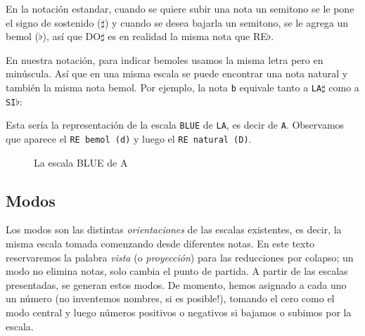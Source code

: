 \documentclass[]{report}
\begin{document}
En la notación estandar, cuando se quiere subir una nota un semitono se le pone el signo de sostenido ($\sharp$) y cuando se desea bajarla un semitono, se le agrega un bemol ($\flat$), así que DO$\sharp$ es en realidad la misma nota que RE$\flat$.

En nuestra notación, para indicar bemoles usamos la misma letra pero en minúscula. Así que en una misma escala se puede encontrar una nota natural y también la misma nota bemol. Por ejemplo, la nota \texttt{b} equivale tanto a \texttt{LA$\sharp$} como a \texttt{SI$\flat$}:

Esta sería la representación de la escala \texttt{BLUE} de \texttt{LA}, es decir de \texttt{A}. Observamos que aparece el \texttt{RE\ bemol\ (d)} y luego el \texttt{RE\ natural\ (D)}.
\begin{figure}[h]
	\centering
	\vspace{12pt}
	\caption{La escala BLUE de A}\label{fig:blue-scale-of-a}
\end{figure}

\subsection{Modos}
Los modos son las distintas \emph{orientaciones} de las escalas existentes, es decir, la misma escala tomada comenzando desde diferentes notas. En este texto reservaremos la palabra \emph{vista} (o \emph{proyección}) para las reducciones por colapso; un modo no elimina notas, solo cambia el punto de partida.
A partir de las escalas presentadas, se generan estos modos. De momento, hemos asignado a cada uno un número (no inventemos nombres, si es posible!), tomando el cero como el modo central y luego números positivos o negativos si bajamos o subimos por la escala.
\end{document}
